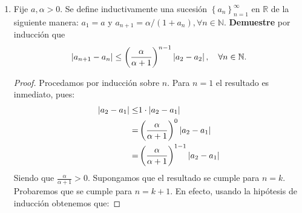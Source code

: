 \documentclass[12pt]{article}
\begin{document}
\begin{enumerate}
\begin{proof}
        De (II): Procedamos por inducción sobre $n$. Para $n=2$ el resultado es inmediato, pues:
        \begin{equation*}
            1-\frac{1}{2}=\frac{1}{2}
        \end{equation*}
        Supongamos que el resultado se cumple para $n=k$. Probaremos que se cumple para $n=k+1$. En efecto, usando la hipótesis de inducción obtenemos que:
        \begin{equation*}
            \begin{split}
                \left(1-\frac{1}{2}\right)\left(1-\frac{1}{3}\right)\cdots\left(1-\frac{1}{k}\right)\left(1-\frac{1}{k+1}\right)=&\frac{1}{k}\cdot\left(1-\frac{1}{k+1}\right)\\
                =&\frac{1}{k}\cdot\frac{k+1-1}{k+1}\\
                =&\frac{1}{k}\cdot\frac{k}{k+1}\\
                =&\frac{1}{k+1}
            \end{split}
        \end{equation*}
        De esta forma, el resultado se cumple para $n=k+1$. Aplicando inducción, el resultado se cumple para toda $n\in\mathbb{N}$, $n\geq2$.
        \qed
    \end{proof}
    \item Fije $a,\alpha>0$. Se define inductivamente una sucesión $\left\{a_n\right\}^{\infty}_{n=1}$ en $\mathbb{R}$ de la siguiente manera: $a_1 = a$ y $a_{n+1}=\alpha/\left(1+a_n\right), \forall n\in\mathbb{N}$. \textbf{Demuestre} por inducción que
    \begin{equation*}
        \left| a_{n+1}-a_n \right|\leq\left(\frac{\alpha}{\alpha+1}\right)^{n-1}\left| a_2-a_2 \right|,\quad\forall n\in\mathbb{N}.
    \end{equation*}
    \begin{proof}
        Procedamos por inducción sobre $n$. Para $n=1$ el resultado es inmediato, pues:
        \begin{equation*}
            \begin{split}
                \left| a_2-a_1 \right|\leq&1\cdot\left| a_2-a_1 \right|\\
                =&\left(\frac{\alpha}{\alpha+1}\right)^0\left| a_2-a_1 \right|\\
                =&\left(\frac{\alpha}{\alpha+1}\right)^{1-1}\left| a_2-a_1 \right|
            \end{split}
        \end{equation*}
        Siendo que $\frac{\alpha}{\alpha+1}>0$. Supongamos que el resultado se cumple para $n=k$. Probaremos que se cumple para $n=k+1$. En efecto, usando la hipótesis de inducción obtenemos que:

\end{proof}
\end{enumerate}
\end{document}
